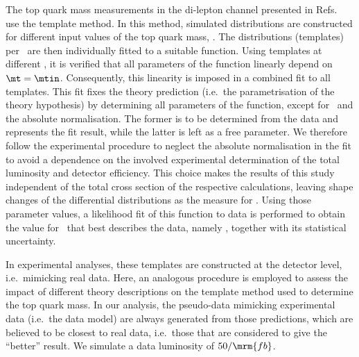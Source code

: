 The top quark mass measurements in the di-lepton channel presented in Refs.~\cite{Aad:2015nba,AMaierPhD:2015,Aaboud:2016igd}
 use the template method.
 In this method, simulated distributions are constructed for different
 input values of the top quark mass, \mtin.
 The distributions (templates) per \mtin\ are then individually fitted to a
 suitable function. Using templates at different \mtin, it is verified that all
 parameters of the function linearly depend on $\mt=\mtin$. Consequently, this
 linearity is imposed in a combined fit to all templates.
%
 This fit fixes the theory prediction (i.e.~the parametrisation of the theory
 hypothesis) by determining all parameters of the function, except for \mt\ and
 the absolute normalisation.
%
 The former is to be determined from the data and represents the fit result, while
 the latter is left as a free parameter.
%
 We therefore follow the experimental procedure to neglect the absolute normalisation in the fit
 to avoid a dependence on the involved experimental determination of the total luminosity
 and detector efficiency.
%
 This choice makes the results of this study independent of the total cross section of
 the respective calculations, leaving shape changes of the differential distributions
 as the measure for \mt.
%
 Using those parameter values, a likelihood fit of this function to data is
 performed to obtain the value for \mt\ that best describes the data,
 namely \mtou, together with its statistical uncertainty.


 In experimental analyses, these templates are constructed at the detector
 level, i.e.~mimicking real data.
%
 Here, an analogous procedure is employed to
 assess the impact of different theory descriptions on
 the template method used to determine the top quark mass.
 In our analysis, the pseudo-data mimicking experimental data (i.e.~the data
 model) are always generated from those predictions, which are believed
 to be closest to real data, i.e.~those that are considered to give
 the ``better'' result.
%
 We simulate a data luminosity of $50/\mrm{fb}$.


